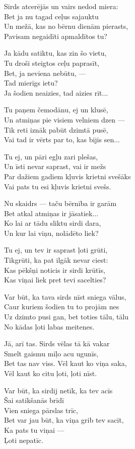 \documentclass[14pt]{extarticle}
\begin{document}
{{Sirds atcerējās un vairs nedod miera:\\
Bet ja nu tagad ceļus sajauktu\\
Un mežā, kas no bērnu dienām pierasts,\\
Pavisam negaidīti apmaldītos tu?

Ja kādu satiktu, kas zin šo vietu,\\
Tu droši steigtos ceļu paprasīt,\\
Bet, ja neviena nebūtu, ---\\
Tad mierīgs ietu?\\
Ja šodien neaizies, tad aizies rīt...

Tu paņem čemodānu, ej un klusē,\\
Un atmiņas pie visiem velniem dzen ---\\
Tik reti iznāk pabūt dzimtā pusē,\\
Vai tad ir vērts par to, kas bijis sen...

Tu ej, un pāri egļu zari plešas,\\
Un īsti nevar saprast, vai ir mežs\\
Par dažiem gadiem kļuvis krietni svešāks\\
Vai pats tu esi kļuvis krietni svešs. 

Nu skaidrs --- taču bērnība ir garām\\
Bet atkal atmiņas ir jāsatiek...\\
Ko lai ar tādu sliktu sirdi dara,\\
Un kur lai viņu, nolādēto liek?

Tu ej, un tev ir saprast ļoti grūti,\\
Tikgrūti, ka pat ilgāk nevar ciest:\\
Kas pēkšņi noticis ir sirdi krūtīs,\\
Kas viņai liek pret tevi sacelties?

Var būt, ka tava sirds nīst sniega vālus,\\
Caur kuriem šodien tu to projām nes\\
Uz dzimto pusi gan, bet toties tālu, tālu\\
No kādas ļoti labas meitenes. 

Jā, arī tas. Sirds vēlas tā kā vakar\\
Smelt gaismu mīļo acu ugunīs,\\
Bet tas nav viss. Vēl kaut ko viņa saka,\\
Vēl kaut ko citu ļoti, ļoti nīst. 

Var būt, ka sirdij netīk, ka tev acīs\\
Šai satikšanās brīdī\\
Vien sniega pārslas trīc,\\
Bet var jau būt, ka viņa grib tev sacīt,\\
Ka pats tu viņai ---\\
Ļoti nepatīc. 

}}
\end{document}
